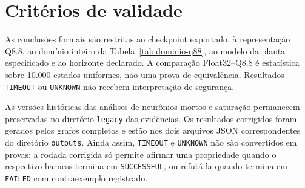 \section{Critérios de validade}

As conclusões formais são restritas ao checkpoint exportado, à representação
Q8.8, ao domínio inteiro da Tabela~\ref{tab:dominio-q88}, ao modelo da planta
especificado e ao horizonte declarado. A comparação Float32--Q8.8 é estatística
sobre 10.000 estados uniformes, não uma prova de equivalência. Resultados
\texttt{TIMEOUT} ou \texttt{UNKNOWN} não recebem interpretação de segurança.

As versões históricas das análises de neurônios mortos e saturação permanecem
preservadas no diretório \texttt{legacy} das evidências. Os resultados
corrigidos foram gerados pelos grafos completos e estão nos dois arquivos JSON
correspondentes do diretório \texttt{outputs}. Ainda assim,
\texttt{TIMEOUT} e \texttt{UNKNOWN} não são convertidos em provas: a rodada
corrigida só permite afirmar uma propriedade quando o respectivo harness
termina em \texttt{SUCCESSFUL}, ou refutá-la quando termina em
\texttt{FAILED} com contraexemplo registrado.

